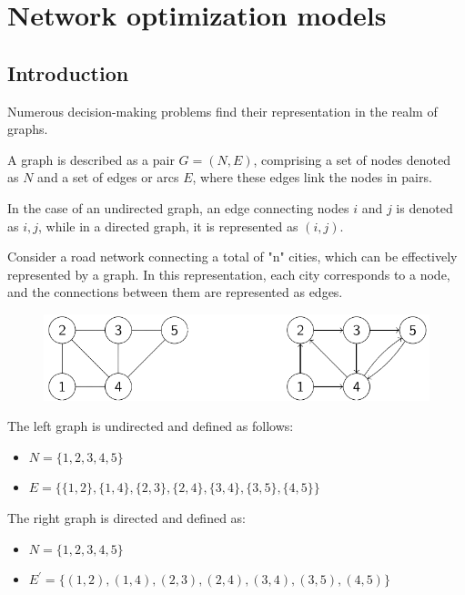 \documentclass[12pt, a4paper]{report}
\begin{document}
\newpage

\chapter{Network optimization models}
    \section{Introduction}
    Numerous decision-making problems find their representation in the realm of graphs.
    \begin{definition}
        A graph is described as a pair $G=(N,E)$, comprising a set of nodes denoted as $N$ and a set of edges or arcs $E$, where these edges link the nodes in pairs.

        In the case of an undirected graph, an edge connecting nodes $i$ and $j$ is denoted as ${i,j}$, while in a directed graph, it is represented as $(i,j)$.    
    \end{definition}
    \begin{example}
        Consider a road network connecting a total of "n" cities, which can be effectively represented by a graph. 
        In this representation, each city corresponds to a node, and the connections between them are represented as edges.        
        \begin{figure}[H]
            \centering
            \includegraphics[width=0.75\linewidth]{images/graph.png}
        \end{figure}
        The left graph is undirected and defined as follows:
        \begin{itemize}
            \item $N=\{1,2,3,4,5\}$
            \item $E=\{\{1,2\},\{1,4\},\{2,3\},\{2,4\},\{3,4\},\{3,5\},\{4,5\}\}$
        \end{itemize}
        The right graph is directed and defined as:
        \begin{itemize}
            \item $N=\{1,2,3,4,5\}$
            \item $E^{'}=\{(1,2),(1,4),(2,3),(2,4),(3,4),(3,5),(4,5)\}$
        \end{itemize}
    \end{example}
\end{document}
